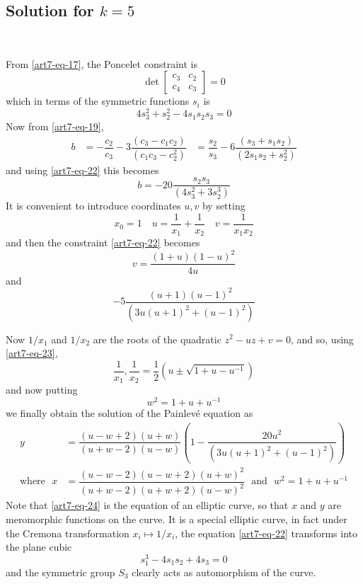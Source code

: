 \subsection{Solution for \boldmath$k=5$}\label{art7-subsec-6.3}
~

\smallskip
\noindent
From \eqref{art7-eq-17}, the Poncelet constraint is
$$
\det
\begin{bmatrix}
c_{3} & c_{2}\\
c_{4} & c_{3}
\end{bmatrix}
=0
$$
which in terms of the symmetric functions $s_{i}$ is
\begin{equation*}\label{art7-eq-22}
4s_{3}^{2} +s_{2}^{2} - 4s_{1}s_{2}s_{3} =0\tag{22}
\end{equation*}
Now from \eqref{art7-eq-19},
\begin{align*}
b &= -\dfrac{c_{2}}{c_{3}} -3 \dfrac{(c_{3}-c_{1}c_{2})}{(c_{1}c_{3}-c_{2}^{2})}
 &=\dfrac{s_{2}}{s_{3}} -6\dfrac{(s_{3}+s_{1}s_{2})}{(2s_{1}s_{2}+s_{2}^{2})}
\end{align*}\pageoriginale
and using \eqref{art7-eq-22} this becomes
$$
b =-20 \dfrac{s_{2}s_{3}}{(4s_{3}^{2} + 3s_{2}^{3})}
$$
It is convenient to introduce coordinates $u, v$ by setting
$$
x_{0}=1 \quad  u=\dfrac{1}{x_{1}} + \dfrac{1}{x_{2}} \quad v= \dfrac{1}{x_{1}x_{2}}
$$
and then the constraint \eqref{art7-eq-22} becomes
\begin{equation*}\label{art7-eq-23}
v = \dfrac{(1+u)(1-u)^{2}}{4u}\tag{23}
\end{equation*}
and
$$
-5\dfrac{(u+1)(u-1)^{2}}{(3u(u+1)^{2} + (u-1)^{2})}
$$

Now $1/x_{1}$ and $1/x_{2}$ are the roots of the quadratic $z^{2}-uz +v =0$, and so, using \eqref{art7-eq-23},
$$
\dfrac{1}{x_{1}}, \dfrac{1}{x_{2}} = \dfrac{1}{2}(u \pm \sqrt{1+u-u^{-1}})
$$
and now putting
\begin{equation*}\label{art7-eq-24}
w^{2} = 1+u +u^{-1}\tag{24}
\end{equation*}
we finally obtain the solution of the Painlev\'e equation as
\begin{align*}
y &=  \dfrac{(u-w+2)(u+w)}{(u+w-2)(u-w)} \left(1- \dfrac{20u^{2}}{(3u(u+1)^{2} + (u-1)^{2})} \right)\\
\text{where~~}  x &= \dfrac{(u-w-2)(u-w+2)(u+w)^{2}}{(u+w-2)(u+w+2)(u-w)^{2}}\text{~ and~ }  w^{2}=1+u+u^{-1}
\end{align*}
Note that \eqref{art7-eq-24} is the equation of an elliptic curve, so that $x$ and $y$ are meromorphic functions on the curve. It is a special elliptic curve, in fact under the Cremona transformation $x_{i}\mapsto 1/x_{i}$, the equation \eqref{art7-eq-22} transforms into the plane cubic
$$
s_{1}^{3}-4s_{1}s_{2}+4s_{3} =0
$$
and the symmetric group $S_{3}$ clearly acts as automorphism of the curve.

